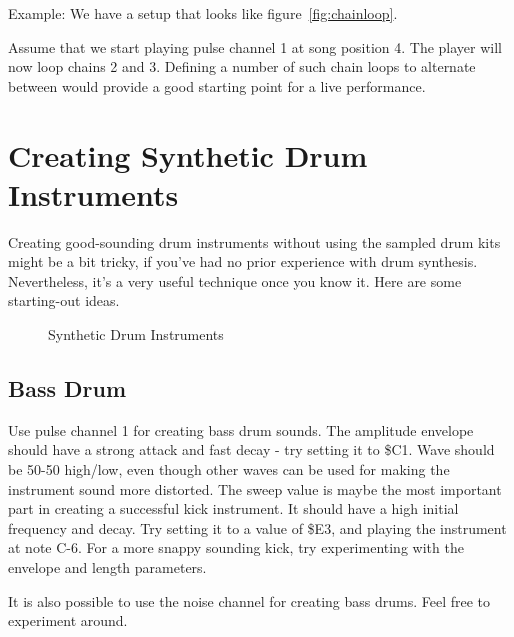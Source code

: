 Example: We have a setup that looks like figure~\ref{fig:chainloop}.

Assume that we start playing pulse channel 1 at song position 4. The player will now loop chains 2 and 3. Defining a number of such chain loops to alternate between would provide a good starting point for a live performance.

\section{Creating Synthetic Drum Instruments}

Creating good-sounding drum instruments without using the sampled drum kits might be a bit tricky, if you've had no prior experience with drum synthesis. Nevertheless, it's a very useful technique once you know it. Here are some starting-out ideas.

\begin{figure}[hbtp]
	\centering
	\qquad

	\qquad

	\qquad

	\caption{Synthetic Drum Instruments}
	\label{fig:instr-examples}
\end{figure} 

\subsection{Bass Drum}

Use pulse channel 1 for creating bass drum sounds. The amplitude envelope should have a strong attack and fast decay - try setting it to \$C1. Wave should be 50-50 high/low, even though other waves can be used for making the instrument sound more distorted. The sweep value is maybe the most important part in creating a successful kick instrument. It should have a high initial frequency and decay. Try setting it to a value of \$E3, and playing the instrument at note C-6. For a more snappy sounding kick, try experimenting with the envelope and length parameters.

It is also possible to use the noise channel for creating bass drums. Feel free to experiment around.

